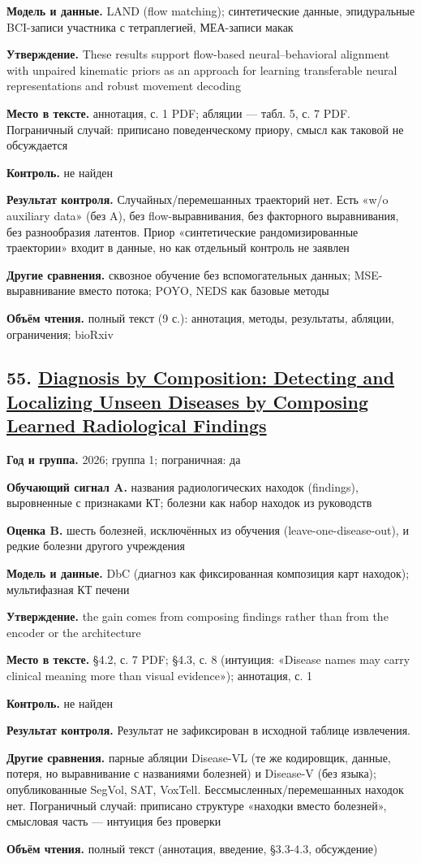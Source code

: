 \textbf{Модель и данные.} LAND (flow matching); синтетические данные, эпидуральные BCI-записи участника с тетраплегией, МЕА-записи макак

\textbf{Утверждение.} These results support flow-based neural–behavioral alignment with unpaired kinematic priors as an approach for learning transferable neural representations and robust movement decoding

\textbf{Место в тексте.} аннотация, с. 1 PDF; абляции — табл. 5, с. 7 PDF. Пограничный случай: приписано поведенческому приору, смысл как таковой не обсуждается

\textbf{Контроль.} не найден

\textbf{Результат контроля.} Случайных/перемешанных траекторий нет. Есть «w/o auxiliary data» (без A), без flow-выравнивания, без факторного выравнивания, без разнообразия латентов. Приор «синтетические рандомизированные траектории» входит в данные, но как отдельный контроль не заявлен

\textbf{Другие сравнения.} сквозное обучение без вспомогательных данных; MSE-выравнивание вместо потока; POYO, NEDS как базовые методы

\textbf{Объём чтения.} полный текст (9 с.): аннотация, методы, результаты, абляции, ограничения; bioRxiv


\subsection*{55. \href{https://doi.org/10.48550/arxiv.2611.05231}{Diagnosis by Composition: Detecting and Localizing Unseen Diseases by Composing Learned Radiological Findings}}

\textbf{Год и группа.} 2026; группа 1; пограничная: да

\textbf{Обучающий сигнал A.} названия радиологических находок (findings), выровненные с признаками КТ; болезни как набор находок из руководств

\textbf{Оценка B.} шесть болезней, исключённых из обучения (leave-one-disease-out), и редкие болезни другого учреждения

\textbf{Модель и данные.} DbC (диагноз как фиксированная композиция карт находок); мультифазная КТ печени

\textbf{Утверждение.} the gain comes from composing findings rather than from the encoder or the architecture

\textbf{Место в тексте.} §4.2, с. 7 PDF; §4.3, с. 8 (интуиция: «Disease names may carry clinical meaning more than visual evidence»); аннотация, с. 1

\textbf{Контроль.} не найден

\textbf{Результат контроля.} Результат не зафиксирован в исходной таблице извлечения.

\textbf{Другие сравнения.} парные абляции Disease-VL (те же кодировщик, данные, потеря, но выравнивание с названиями болезней) и Disease-V (без языка); опубликованные SegVol, SAT, VoxTell. Бессмысленных/перемешанных находок нет. Пограничный случай: приписано структуре «находки вместо болезней», смысловая часть — интуиция без проверки

\textbf{Объём чтения.} полный текст (аннотация, введение, §3.3-4.3, обсуждение)
